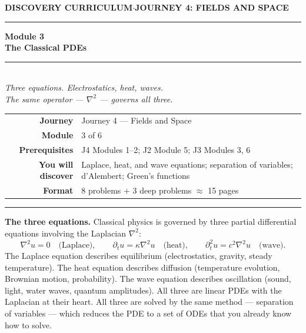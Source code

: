 \documentclass[12pt,a4paper]{article}
\newcounter{problem}
\begin{document}
\thispagestyle{empty}
\begin{center}
{\small\color{MidBlue}\textbf{DISCOVERY CURRICULUM}\quad$\cdot$\quad\textbf{JOURNEY 4: FIELDS AND SPACE}}
\vspace{0.6cm}

{\color{NavyBlue}\rule{\linewidth}{2pt}}\vspace{0.5cm}

{\Huge\bfseries\color{NavyBlue}Module 3}\\[0.3cm]
{\LARGE\bfseries\color{MidBlue}The Classical PDEs}\\[0.4cm]
{\color{Gold}\rule{0.4\linewidth}{1.2pt}}\\[0.4cm]
{\large\itshape\color{DarkGrey}
Three equations. Electrostatics, heat, waves.\\[0.15cm]
The same operator --- $\nabla^2$ --- governs all three.}

\vspace{1cm}
\begin{tabular}{rl}
\color{DarkGrey}\textbf{Journey}         & Journey 4 --- Fields and Space \\[4pt]
\color{DarkGrey}\textbf{Module}          & 3 of 6 \\[4pt]
\color{DarkGrey}\textbf{Prerequisites}   & J4 Modules 1--2; J2 Module 5; J3 Modules 3, 6 \\[4pt]
\color{DarkGrey}\textbf{You will discover} & Laplace, heat, and wave equations; separation of variables; d'Alembert; Green's functions \\[4pt]
\color{DarkGrey}\textbf{Format}          & 8 problems $+$ 3 deep problems $\approx$ 15 pages \\
\end{tabular}
\vspace{1cm}

{\color{NavyBlue}\rule{\linewidth}{2pt}}
\end{center}

\vspace{0.5cm}
\noindent\textbf{The three equations.}
Classical physics is governed by three partial differential equations involving the Laplacian $\nabla^2$:
\[
  \nabla^2 u = 0 \quad\text{(Laplace)}, \qquad
  \partial_t u = \kappa\nabla^2 u \quad\text{(heat)}, \qquad
  \partial_t^2 u = c^2\nabla^2 u \quad\text{(wave)}.
\]
The Laplace equation describes equilibrium (electrostatics, gravity, steady temperature). The heat equation describes diffusion (temperature evolution, Brownian motion, probability). The wave equation describes oscillation (sound, light, water waves, quantum amplitudes). All three are linear PDEs with the Laplacian at their heart. All three are solved by the same method --- separation of variables --- which reduces the PDE to a set of ODEs that you already know how to solve.
\end{document}
